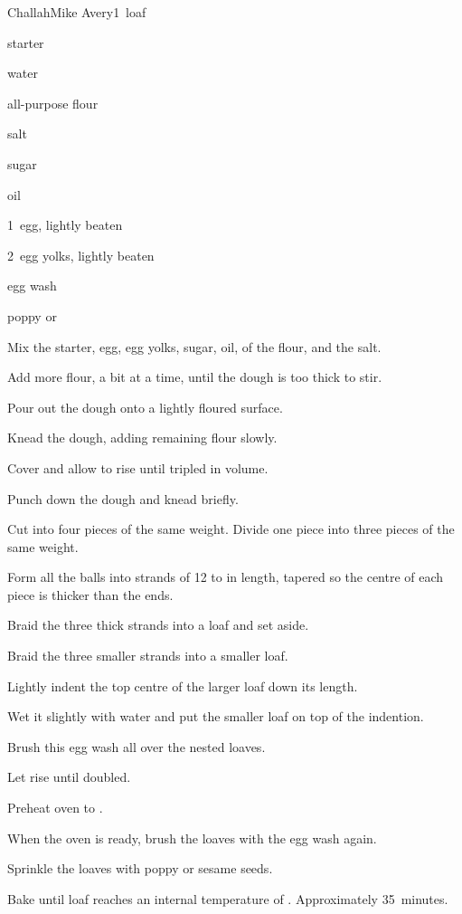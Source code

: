 \begin{recipe}{Challah}{Mike Avery}{1~loaf}

\begin{ingredients}
\item {} starter
\item \C{\half} water
\item {} all-purpose flour
\item {} salt
\item \C{\quarter} sugar
\item \C{\quarter} oil
\item 1~egg, lightly beaten
\item 2~egg yolks, lightly beaten
\item egg wash
\item poppy or 
\end{ingredients}

\begin{directions}
\item Mix the starter, egg, egg yolks, sugar, oil, \half{} of the flour, and the salt.
\item Add more flour, a bit at a time, until the dough is too thick to stir.
\item Pour out the dough onto a lightly floured surface.
\item Knead the dough, adding remaining flour slowly.
\item Cover and allow to rise until tripled in volume.
\item Punch down the dough and knead briefly.
\item Cut into four pieces of the same weight. Divide one piece into three pieces of the same weight.
\item Form all the balls into strands of 12 to  in length, tapered so the centre of each piece is thicker than the ends.
\item Braid the three thick strands into a loaf and set aside.
\item Braid the three smaller strands into a smaller loaf.
\item Lightly indent the top centre of the larger loaf down its length.
\item Wet it slightly with water and put the smaller loaf on top of the indention.
\item Brush this egg wash all over the nested loaves.
\item Let rise until doubled.
\item Preheat oven to .
\item When the oven is ready, brush the loaves with the egg wash again.
\item Sprinkle the loaves with poppy or sesame seeds.
\item Bake until loaf reaches an internal temperature of . Approximately 35~minutes.
\end{directions}

\end{recipe}
